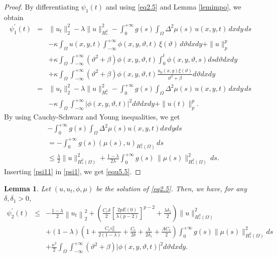 \documentclass[12pt]{article}
\numberwithin{equation}{section}
\newtheorem{lemma}[theorem]{Lemma}
\begin{document}
\begin{proof}
By differentiating $\psi_1(t)$ and using \eqref{eq2.5} and Lemma \ref{lemimpo}, we obtain
\begin{eqnarray}\label{psi1}
\psi^{\prime}_1(t)&=&\|u_{t}\|_{2}^{2}-\lambda \|u\|^2_{H^2_*}- \displaystyle\int_{0}^{+\infty} g(s) \int_{\Omega} \Delta^{2}\mu(s)\,u(x,y,t)\,dx dy\,ds\nonumber\\
&&-\kappa \displaystyle\int_{\Omega} u(x,y,t) \int_{-\infty}^{+\infty}
            \phi(x,y,\vartheta,t)\,\xi(\vartheta)\,d\vartheta  dx dy+ \|u\|_{p}^{p}\nonumber\\
&&+\kappa\int_{\Omega} \int_{-\infty}^{+\infty}\left(\vartheta^{2}+\beta\right)\phi(x,y,\vartheta,t)\int_{0}^{t} \phi(x,y,\vartheta,s) d s d\vartheta dx dy\nonumber\\
&&+\kappa\int_{\Omega} \int_{-\infty}^{+\infty}\left(\vartheta^{2}+\beta\right)\phi(x,y,\vartheta,t)\frac{u_{0}(x,y) \xi(\vartheta)}{\vartheta^{2}+\beta} d\vartheta dx dy\nonumber\\
&=&\|u_{t}\|_{2}^{2}-\lambda \|u\|^2_{H^2_*}- \displaystyle\int_{0}^{+\infty} g(s) \int_{\Omega} \Delta^{2}\mu(s)\,u(x,y,t)\,dx dy\,ds\nonumber\\
&&-\kappa \int_{\Omega} \int_{-\infty}^{+\infty}|\phi(x,y,\vartheta,t)|^2 d\vartheta dx dy+\|u(t)\|_{p}^{p}.
\end{eqnarray}
By using  Cauchy-Schwarz and Young inequalities, we get
\begin{align}\label{psi11}
&-\int_{0}^{+\infty} g(s)\int_{\Omega} \Delta^{2}\mu(s) u(x,y,t) dx dyds\nonumber\\
&= -\int_{0}^{+\infty} g(s) ( \mu(s), u)_{H_*^{2}(\Omega)}\,ds \nonumber\\
&\le \frac{\lambda}{2}\|u\|^2_{H^2_*(\Omega)}
  + \frac{1-\lambda}{2\lambda}
    \int_{0}^{+\infty} g(s)\,\|\mu(s)\|_{H_*^{2}(\Omega)}^{2}\,ds.
\end{align}
Inserting \eqref{psi11} in \eqref{psi1}, we get \eqref{equ5.5}.
\end{proof}
\begin{lemma}\label{lem5.5}
Let $(u, u_t, \phi, \mu)$ be the solution of \eqref{eq2.5}. Then, we have, for any $\delta, \delta_1>0$,
\begin{eqnarray}\label{equ5.7}
\psi^{\prime}_2(t)&\leq&-\frac{1-\lambda}{2}\left\|u_{t}\right\|_{2}^{2}+\left(\frac{C_{e}\delta}{2}\left[\frac{2 p E(0)}{\lambda(p-2) }\right]^{p-2}+\frac{\lambda\delta_1}{2}\right)\| u\|_{H_*^{2}(\Omega)}^{2} \nonumber\\
&&+(1-\lambda)\left(1+\frac{C_e c_0^2 }{2(1-\lambda)}+\frac{C_e}{2\delta}+\frac{\lambda}{2\delta_1}+\frac{AC_e}{2}\right) \int_{0}^{+\infty} g(s)\|\mu(s)\|_{H_*^{2}(\Omega)}^{2} ds\nonumber\\
&&+\frac{\kappa^2}{2} \int_{\Omega}\int_{-\infty}^{+\infty}\left(\vartheta^{2}+\beta\right)|\phi(x,y,\vartheta, t)|^{2} d\vartheta dx dy.
\end{eqnarray}
\end{lemma}
\end{document}

